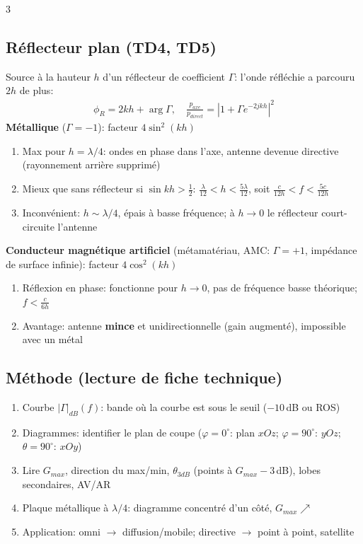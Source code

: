 \documentclass[12pt, a4paper]{article}
\begin{document}
\begin{multicols*}{3}
	\colbreak
	\subsection{Réflecteur plan (TD4, TD5)}
	Source à la hauteur $h$ d'un réflecteur de coefficient $\Gamma$: l'onde réfléchie a parcouru $2h$ de plus:
	\begin{gather*}
		\phi_R=2kh+\arg\Gamma,\quad\frac{p_{axe}}{p_{direct}}=\left|1+\Gamma e^{-2jkh}\right|^2
	\end{gather*}
	\textbf{Métallique} ($\Gamma=-1$): facteur $4\sin^2(kh)$
	\begin{enumerate}[\roman*.]
		\item Max pour $h=\lambda/4$: ondes en phase dans l'axe, antenne devenue directive (rayonnement arrière supprimé)
		\item Mieux que sans réflecteur si $\sin kh>\frac12$: $\frac\lambda{12}<h<\frac{5\lambda}{12}$, soit $\frac{c}{12h}<f<\frac{5c}{12h}$
		\item Inconvénient: $h\sim\lambda/4$, épais à basse fréquence; à $h\to0$ le réflecteur court-circuite l'antenne
	\end{enumerate}
	\textbf{Conducteur magnétique artificiel} (métamatériau, AMC: $\Gamma=+1$, impédance de surface infinie): facteur $4\cos^2(kh)$
	\begin{enumerate}[\roman*.]
		\item Réflexion en phase: fonctionne pour $h\to0$, pas de fréquence basse théorique; $f<\frac{c}{6h}$
		\item Avantage: antenne \textbf{mince} et unidirectionnelle (gain augmenté), impossible avec un métal
	\end{enumerate}

	\subsection{Méthode (lecture de fiche technique)}
	\begin{enumerate}[\roman*.]
		\item Courbe $|\Gamma|_{dB}(f)$: bande où la courbe est sous le seuil ($-10$\,dB ou ROS)
		\item Diagrammes: identifier le plan de coupe ($\varphi=0^\circ$: plan $xOz$; $\varphi=90^\circ$: $yOz$; $\theta=90^\circ$: $xOy$)
		\item Lire $G_{max}$, direction du max/min, $\theta_{3dB}$ (points à $G_{max}-3$\,dB), lobes secondaires, AV/AR
		\item Plaque métallique à $\lambda/4$: diagramme concentré d'un côté, $G_{max}\nearrow$
		\item Application: omni $\to$ diffusion/mobile; directive $\to$ point à point, satellite
	\end{enumerate}


\end{multicols*}
\end{document}
